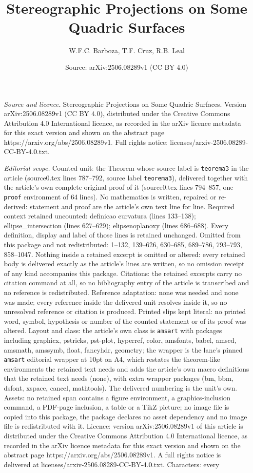 \documentclass[10pt,a4paper]{amsart}
\title[Stereographic Projections on Some Quadric Surfaces]{Stereographic Projections on Some Quadric Surfaces}
\author{W.F.C. Barboza, T.F. Cruz, R.B. Leal}
\date{Source: arXiv:2506.08289v1 (CC BY 4.0)}
\begin{document}
\maketitle

\noindent\emph{Source and licence.} Stereographic Projections on Some Quadric Surfaces. Version arXiv:2506.08289v1 (CC BY 4.0), distributed under the Creative Commons Attribution 4.0 International licence, as recorded in the arXiv licence metadata for this exact version and shown on the abstract page https://arxiv.org/abs/2506.08289v1. Full rights notice: licenses/arxiv-2506.08289-CC-BY-4.0.txt.\par\smallskip

\noindent\textit{Editorial scope.} Counted unit: the Theorem whose source label is \texttt{teorema3} in the article (source0.tex lines 787--792, source label \texttt{teorema3}), delivered together with the article's own complete original proof of it (source0.tex lines 794--857, one \texttt{proof} environment of 64 lines). No mathematics is written, repaired or re-derived: statement and proof are the article's own text line for line. Required context retained uncounted: definicao curvatura (lines 133--138); ellipse\_intersection (lines 627--629); elipsenoplanoxy (lines 686--688). Every definition, display and label of those lines is retained unchanged. Omitted from this package and not redistributed: 1--132, 139--626, 630--685, 689--786, 793--793, 858--1047. Nothing inside a retained excerpt is omitted or altered: every retained body is delivered exactly as the article's lines are written, so no omission receipt of any kind accompanies this package. Citations: the retained excerpts carry no citation command at all, so no bibliography entry of the article is transcribed and no reference is redistributed. Reference adaptation: none was needed and none was made; every reference inside the delivered unit resolves inside it, so no unresolved reference or citation is produced. Printed slips kept literal: no printed word, symbol, hypothesis or number of the counted statement or of its proof was altered. Layout and class: the article's own class is \texttt{amsart} with packages including graphicx, pstricks, pst-plot, hyperref, color, amsfonts, babel, amscd, amsmath, amssymb, float, fancyhdr, geometry; the wrapper is the lane's pinned \texttt{amsart} editorial wrapper at 10pt on A4, which restates the theorem-like environments the retained text needs and adds the article's own macro definitions that the retained text needs (none), with extra wrapper packages (bm, bbm, dsfont, xspace, cancel, mathtools). The delivered numbering is the unit's own. Assets: no retained span contains a figure environment, a graphics-inclusion command, a PDF-page inclusion, a table or a TikZ picture; no image file is copied into this package, the package declares no asset dependency and no image file is redistributed with it. Licence: version arXiv:2506.08289v1 of this article is distributed under the Creative Commons Attribution 4.0 International licence, as recorded in the arXiv licence metadata for this exact version and shown on the abstract page https://arxiv.org/abs/2506.08289v1. A full rights notice is delivered at licenses/arxiv-2506.08289-CC-BY-4.0.txt. Characters: every 
\end{document}
